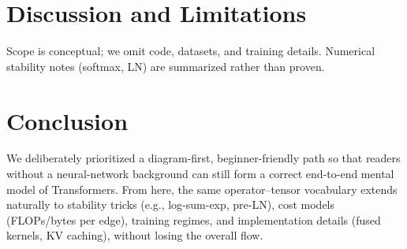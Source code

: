 \documentclass[10pt]{article}
\begin{document}
\section{Discussion and Limitations}
Scope is conceptual; we omit code, datasets, and training details. Numerical stability notes (softmax, LN) are summarized rather than proven.

\section{Conclusion}
We deliberately prioritized a diagram-first, beginner-friendly path so that readers without a neural-network background can still form a correct end-to-end mental model of Transformers.
From here, the same operator–tensor vocabulary extends naturally to stability tricks (e.g., log-sum-exp, pre-LN), cost models (FLOPs/bytes per edge), training regimes, and implementation details (fused kernels, KV caching), without losing the overall flow.

% 

\end{document}
